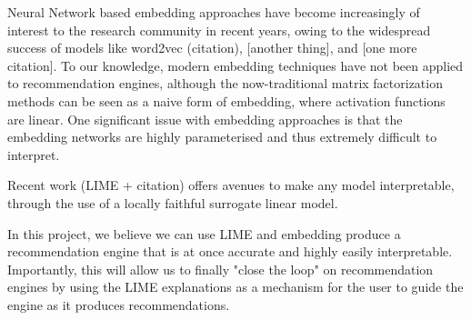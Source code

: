 Neural Network based embedding approaches have become increasingly of interest to the research community in recent years, owing to the widespread success of models like word2vec (citation), [another thing], and [one more citation]. To our knowledge, modern embedding techniques have not been applied to recommendation engines, although the now-traditional matrix factorization methods can be seen as a naive form of embedding, where activation functions are linear. One significant issue with embedding approaches is that the embedding networks are highly parameterised and thus extremely difficult to interpret.

Recent work (LIME + citation) offers avenues to make any model interpretable, through the use of a locally faithful surrogate linear model. 

In this project, we believe we can use LIME and embedding  produce a recommendation engine that is at once accurate and highly easily interpretable. Importantly, this will allow us to finally "close the loop" on recommendation engines by using the LIME explanations as a mechanism for the user to guide the engine as it produces recommendations.

 